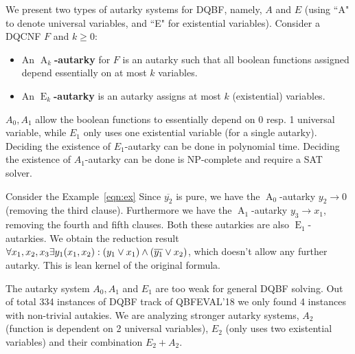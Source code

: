 \documentclass[conference]{IEEEtran}
\DeclareMathOperator{\Aaut}{A}
\DeclareMathOperator{\Eaut}{E}
\begin{document}
We present two types of autarky systems for DQBF, namely, $A$ and $E$ (using ``A" to denote universal variables, and ``E" for existential variables).
%
Consider a DQCNF $F$ and $k \ge 0$:
\begin{itemize}
	\item An \textbf{$\Aaut_k$-autarky} for $F$ is an autarky such that all boolean functions assigned depend essentially on at most $k$ variables.
	\item An \textbf{$\Eaut_k$-autarky} is an autarky assigns at most $k$ (existential) variables.
\end{itemize}

$A_0, A_1$ allow the boolean functions to essentially depend on 0 resp. 1 universal variable, while $E_1$ only uses one existential variable (for a single autarky).
%
Deciding the existence of $E_1$-autarky can be done in polynomial time.
%
Deciding the existence of $A_1$-autarky can be done is NP-complete and require a SAT solver.
%

Consider the Example~\ref{eqn:ex}
Since $\overline{y_2}$ is pure, we have the $\Aaut_0$-autarky $y_2 \rightarrow 0$ (removing the third clause).
Furthermore we have the $\Aaut_1$-autarky $y_3 \rightarrow x_1$, removing the fourth and fifth clauses.
Both these autarkies are also $\Eaut_1$-autarkies.
We obtain the reduction result $\forall x_1,x_2,x_3 \exists y_1(x_1,x_2) : (y_1 \vee x_1) \wedge (\overline{y_1} \vee x_2)$, 
which doesn't allow any further autarky. 
%
This is lean kernel of the original formula.

The autarky system $A_0, A_1$ and $E_1$ are too weak for general DQBF solving. Out of total 334 instances of DQBF track of QBFEVAL'18 we only found 4 instances with non-trivial autakies. We are analyzing stronger autarky systems, $A_2$ (function is dependent on 2 universal variables), $E_2$ (only uses two existential variables) and their combination $E_2 + A_2$. 
%
\end{document}

